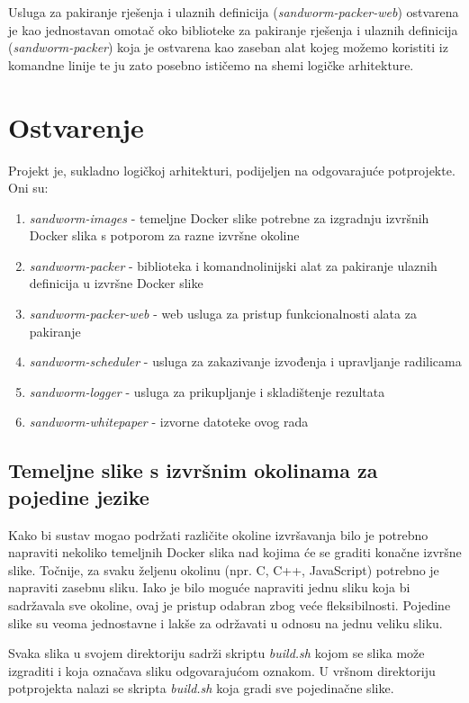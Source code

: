 \documentclass[times, utf8, zavrsni]{fer}
\begin{document}
Usluga za pakiranje rješenja i ulaznih definicija ({\textit{sandworm-packer-web}}) ostvarena je kao jednostavan omotač oko biblioteke za pakiranje rješenja i ulaznih definicija ({\textit{sandworm-packer}}) koja je ostvarena kao zaseban alat kojeg možemo koristiti iz komandne linije te ju zato posebno ističemo na shemi logičke arhitekture.


\section{Ostvarenje}
\label{sec:implementation}

Projekt je, sukladno logičkoj arhitekturi, podijeljen na odgovarajuće potprojekte. Oni su:

\begin{enumerate}
\item {\textit{sandworm-images}} - temeljne Docker slike potrebne za izgradnju izvršnih Docker slika s potporom za razne izvršne okoline
\item {\textit{sandworm-packer}} - biblioteka i komandnolinijski alat za pakiranje ulaznih definicija u izvršne Docker slike
\item {\textit{sandworm-packer-web}} - web usluga za pristup funkcionalnosti alata za pakiranje
\item {\textit{sandworm-scheduler}} - usluga za zakazivanje izvođenja i upravljanje radilicama
\item {\textit{sandworm-logger}} - usluga za prikupljanje i skladištenje rezultata
\item {\textit{sandworm-whitepaper}} - izvorne datoteke ovog rada
\end{enumerate}


\subsection{Temeljne slike s izvršnim okolinama za pojedine jezike}

Kako bi sustav mogao podržati različite okoline izvršavanja bilo je potrebno napraviti nekoliko temeljnih Docker slika nad kojima će se graditi konačne izvršne slike. Točnije, za svaku željenu okolinu (npr. C, C++, JavaScript) potrebno je napraviti zasebnu sliku. Iako je bilo moguće napraviti jednu sliku koja bi sadržavala sve okoline, ovaj je pristup odabran zbog veće fleksibilnosti. Pojedine slike su veoma jednostavne i lakše za održavati u odnosu na jednu veliku sliku.

Svaka slika u svojem direktoriju sadrži skriptu {\textit{build.sh}} kojom se slika može izgraditi i koja označava sliku odgovarajućom oznakom. U vršnom direktoriju potprojekta nalazi se skripta {\textit{build.sh}} koja gradi sve pojedinačne slike.
\end{document}
